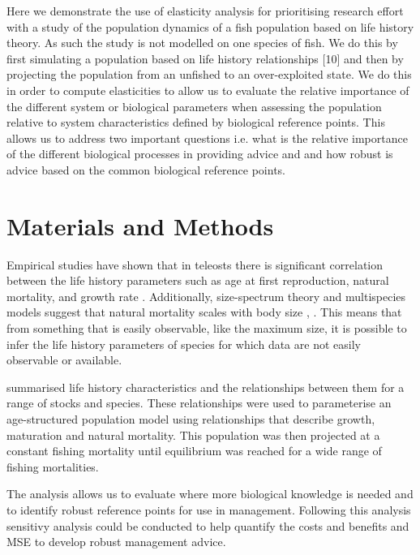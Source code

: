 \documentclass{pnastwo}
\begin{document}
\begin{article}
Here we demonstrate the use of elasticity analysis for prioritising research eﬀort with a study of the population dynamics of a fish population based on life history theory. As such the study is not modelled on one species of fish. We do this by first simulating a population based on life history relationships [10] and then by projecting the population from an unfished to an over-exploited state. We do this in order to compute elasticities to allow us to evaluate the relative importance of the diﬀerent system or biological parameters when assessing the population relative to system characteristics defined by biological reference points. This allows us to address two important questions i.e. what is the relative importance of the diﬀerent biological processes in providing advice and and how robust is advice based on the common biological reference points. 

\section*{Materials and Methods}

Empirical studies have shown that in teleosts there is significant correlation between the life history parameters  
such as age at first reproduction, natural mortality, and growth rate \cite{roff1984evolution}. Additionally, size-spectrum theory 
and multispecies models suggest that natural mortality scales with body size \cite{andersen2006asymptotic}, 
\cite{pope2006modelling} \cite{gislason2008coexistence}. This means that from something that is easily observable, like the maximum size,
it is possible to infer the life history parameters of species for which data are not easily observable or available.

\cite{gislason2008coexistence} summarised life history characteristics and the relationships between them for a range of stocks and species. 
These relationships were used to parameterise an age-structured population model using relationships that describe growth, maturation and natural mortality.
This population was then projected at a constant fishing mortality until equilibrium was reached for a wide range of fishing mortalities.

The analysis allows us to evaluate where more biological knowledge is needed and to identify robust reference points for use in management. Following this analysis
sensitivy analysis could be conducted to help quantify the costs and benefits and MSE to develop robust management advice.


\end{article}
\end{document}
